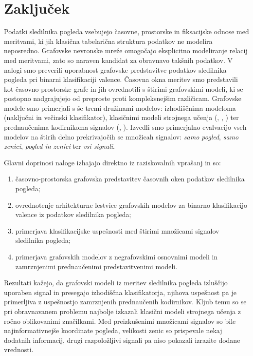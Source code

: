 \chapter{Zaključek}
\label{sec:zakljucek}

Podatki sledilnika pogleda vsebujejo časovne, prostorske in fiksacijske odnose med meritvami, ki jih klasična tabelarična struktura podatkov ne modelira neposredno.
Grafovske nevronske mreže omogočajo eksplicitno modeliranje relacij med meritvami, zato so naraven kandidat za obravnavo takšnih podatkov.
V nalogi smo preverili uporabnost grafovske predstavitve podatkov sledilnika pogleda pri binarni klasifikaciji valence.
Časovna okna meritev smo predstavili kot časovno-prostorske grafe in jih ovrednotili s štirimi grafovskimi modeli, ki se postopno nadgrajujejo od preproste proti kompleksnejšim različicam.
Grafovske modele smo primerjali s še tremi družinami modelov: izhodiščnima modeloma (naključni in večinski klasifikator), klasičnimi modeli strojnega učenja (, , ) ter prednaučenima kodirnikoma signalov (, ).
Izvedli smo primerjalno evalvacijo vseh modelov na štirih delno prekrivajočih se množicah signalov: \emph{samo pogled}, \emph{samo zenici}, \emph{pogled in zenici} ter \emph{vsi signali}.

Glavni doprinosi naloge izhajajo direktno iz raziskovalnih vprašanj in so:

\begin{enumerate}
    \item časovno-prostorska grafovska predstavitev časovnih oken podatkov sledilnika pogleda;
    \item ovrednotenje arhitekturne lestvice grafovskih modelov za binarno klasifikacijo valence iz podatkov sledilnika pogleda;
    \item primerjava klasifikacijske uspešnosti med štirimi množicami signalov sledilnika pogleda;
    \item primerjava grafovskih modelov z negrafovskimi osnovnimi modeli in zamrznjenimi prednaučenimi predstavitvenimi modeli.
\end{enumerate}

Rezultati kažejo, da grafovski modeli iz meritev sledilnika pogleda izluščijo uporaben signal in presegajo izhodiščna klasifikatorja, njihova uspešnost pa je primerljiva z uspešnostjo zamrznjenih prednaučenih kodirnikov.
Kljub temu so se pri obravnavanem problemu najbolje izkazali klasični modeli strojnega učenja z ročno oblikovanimi značilkami.
Med preizkušenimi množicami signalov so bile najinformativnejše koordinate pogleda, velikosti zenic so prispevale nekaj dodatnih informacij, drugi razpoložljivi signali pa niso pokazali izrazite dodane vrednosti.

